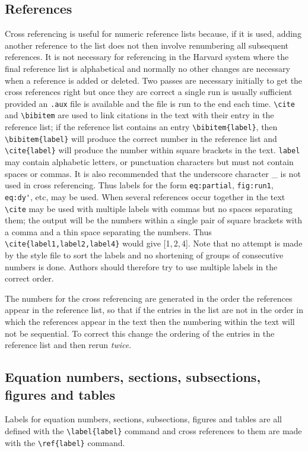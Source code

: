 \documentclass[12pt]{iopart}
\begin{document}
\subsection{References}
\label{refs}
Cross referencing is useful for numeric reference lists because, if it 
is used, adding 
another reference to the list does not then involve renumbering all 
subsequent references. It is not necessary for referencing 
in the Harvard system where the final reference list is alphabetical 
and normally no other changes are necessary when a reference is added or
deleted.
Two passes are necessary initially to get the cross references right 
but once they are correct a single run is usually sufficient provided an 
\verb".aux" file is available and the file 
is run to the end each time.
\verb"\cite" and \verb"\bibitem" are used to link citations in the text
with their entry in the reference list;
if the 
reference list contains an entry \verb"\bibitem{label}", 
then \verb"\bibitem{label}" 
will produce the correct number in the reference list and 
\verb"\cite{label}" will produce the number within square brackets in the 
text. \verb"label" may contain alphabetic letters, 
or punctuation characters but must not contain spaces or commas. It is also
recommended that the underscore character \_{} is not used in cross
referencing. 
Thus labels for the form 
\verb"eq:partial", \verb"fig:run1", \verb"eq:dy'", 
etc, may be used. When several 
references occur together in the text \verb"\cite" may be used with 
multiple labels with commas but no spaces separating them; 
the output will be the 
numbers within a single pair of square brackets with a comma and a 
thin space separating the numbers. Thus \verb"\cite{label1,label2,label4}"
would give [1,\,2,\,4]. Note that no attempt is made by the style file to sort the 
labels and no shortening of groups of consecutive numbers is done.
Authors should therefore try to use multiple labels in the correct 
order.

The numbers for the cross referencing are generated in the order the 
references appear in the reference list, so that if the entries in the 
list are not in the order in which the references appear in the text 
then the 
numbering within the text will not be sequential. To correct this 
change the ordering of the entries in the reference list and then 
rerun {\it twice}.

\subsection{Equation numbers, sections, subsections, figures and 
tables}
Labels for equation numbers, sections, subsections, figures and tables 
are all defined with the \verb"\label{label}" command and cross references 
to them are made with the \verb"\ref{label}" command. 
\end{document}
